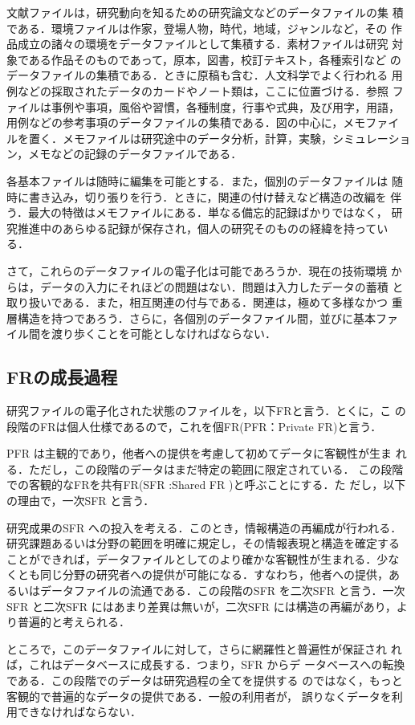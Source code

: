 文献ファイルは，研究動向を知るための研究論文などのデータファイルの集
積である．環境ファイルは作家，登場人物，時代，地域，ジャンルなど，その
作品成立の諸々の環境をデータファイルとして集積する．素材ファイルは研究
対象である作品そのものであって，原本，図書，校訂テキスト，各種索引など
のデータファイルの集積である．ときに原稿も含む．人文科学でよく行われる
用例などの採取されたデータのカードやノート類は，ここに位置づける．参照
ファイルは事例や事項，風俗や習慣，各種制度，行事や式典，及び用字，用語，
用例などの参考事項のデータファイルの集積である．図の中心に，メモファイ
ルを置く．メモファイルは研究途中のデータ分析，計算，実験，シミュレーショ
ン，メモなどの記録のデータファイルである．

各基本ファイルは随時に編集を可能とする．また，個別のデータファイルは
随時に書き込み，切り張りを行う．ときに，関連の付け替えなど構造の改編を
伴う．最大の特徴はメモファイルにある．単なる備忘的記録ばかりではなく，
研究推進中のあらゆる記録が保存され，個人の研究そのものの経緯を持ってい
る．

さて，これらのデータファイルの電子化は可能であろうか．現在の技術環境
からは，データの入力にそれほどの問題はない．問題は入力したデータの蓄積
と取り扱いである．また，相互関連の付与である．関連は，極めて多様なかつ
重層構造を持つであろう．さらに，各個別のデータファイル間，並びに基本ファ
イル間を渡り歩くことを可能としなければならない．

\subsection{FRの成長過程}
研究ファイルの電子化された状態のファイルを，以下FRと言う．とくに，こ
の段階のFRは個人仕様であるので，これを個FR(PFR：Private FR)と言う．

PFR は主観的であり，他者への提供を考慮して初めてデータに客観性が生ま
れる．ただし，この段階のデータはまだ特定の範囲に限定されている．
この段階での客観的なFRを共有FR(SFR :Shared FR )と呼ぶことにする．た
だし，以下の理由で，一次SFR と言う．

研究成果のSFR への投入を考える．このとき，情報構造の再編成が行われる．
研究課題あるいは分野の範囲を明確に規定し，その情報表現と構造を確定する
ことができれば，データファイルとしてのより確かな客観性が生まれる．少な
くとも同じ分野の研究者への提供が可能になる．すなわち，他者への提供，あ
るいはデータファイルの流通である．この段階のSFR を二次SFR と言う．一次
SFR と二次SFR にはあまり差異は無いが，二次SFR には構造の再編があり，よ
り普遍的と考えられる．

ところで，このデータファイルに対して，さらに網羅性と普遍性が保証され
れば，これはデータベースに成長する\cite{Inose1981}．つまり，SFR からデ
ータベースへの転換である．この段階でのデータは研究過程の全てを提供する
のではなく，もっと客観的で普遍的なデータの提供である．一般の利用者が，
誤りなくデータを利用できなければならない．

